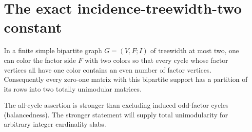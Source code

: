 \section{The exact incidence-treewidth-two constant}\label{sec:width-two}
\begin{theorem}\label{thm:one-sided-coloring}
In a finite simple bipartite graph $G=(V,F;I)$ of treewidth at most two,
one can color the factor side $F$ with two colors so that every cycle
whose factor vertices all have one color contains an even number of
factor vertices. Consequently every zero-one matrix with this bipartite
support has a partition of its rows into two totally unimodular matrices.
\end{theorem}
The all-cycle assertion is stronger than excluding induced odd-factor
cycles (balancedness). The stronger statement will supply total
unimodularity for arbitrary integer cardinality slabs.

